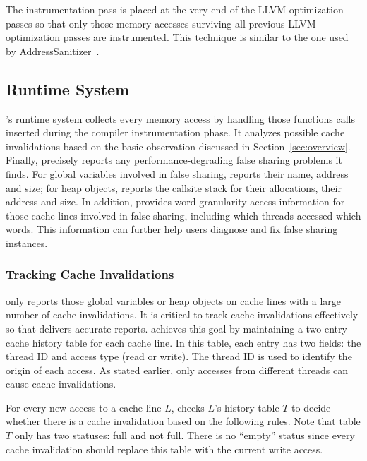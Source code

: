 The instrumentation pass is placed at the very end of the LLVM optimization passes so that only those memory accesses surviving all previous LLVM optimization passes are instrumented.  This technique is similar to the one used by AddressSanitizer~\cite{AddressSanitizer}.

\subsection{Runtime System}
\label{sec:runtime}

\Predator{}'s runtime system collects every memory access by handling those functions calls inserted during the compiler instrumentation phase. It analyzes possible cache invalidations based on the basic observation discussed in Section~\ref{sec:overview}. Finally, \Predator{} precisely reports any performance-degrading false sharing problems it finds.  For global variables involved in false sharing, \Predator{} reports their name, address and size; for heap
objects, \Predator{} reports the callsite stack for their allocations, their address and size. In addition, \Predator{} provides word granularity access information for those cache lines involved in false sharing, including which threads accessed which words.  This information can further help users diagnose and fix false sharing instances.

\subsubsection{Tracking Cache Invalidations}
\Predator{} only reports those global variables or heap objects on cache lines with a large number of cache invalidations. It is critical to track cache invalidations effectively so that \Predator{} delivers accurate reports.
\Predator{} achieves this goal by maintaining a two entry cache history table for each cache line.  In this table,
each entry has two fields: the thread ID and access type (read or write). The thread ID is used to identify the origin of each access. As stated earlier, only accesses from different threads can cause cache invalidations.

For every new access to a cache line $L$, \Predator{} checks $L$'s history table $T$ to decide whether there is a cache invalidation based on the following rules.  Note that table $T$ only has two statuses: full and not full.  There is no ``empty'' status since every cache invalidation should replace this table with the current write access.

